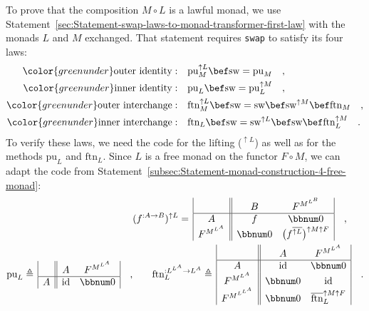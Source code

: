 To prove that the composition $M\circ L$ is a lawful monad, we use
Statement~\ref{sec:Statement-swap-laws-to-monad-transformer-first-law}
with the monads $L$ and $M$ exchanged. That statement requires \lstinline!swap!
to satisfy its four laws:
\begin{align*}
{\color{greenunder}\text{outer identity}:}\quad & \text{pu}_{M}^{\uparrow L}\bef\text{sw}=\text{pu}_{M}\quad,\\
{\color{greenunder}\text{inner identity}:}\quad & \text{pu}_{L}\bef\text{sw}=\text{pu}_{L}^{\uparrow M}\quad,\\
{\color{greenunder}\text{outer interchange}:}\quad & \text{ftn}_{M}^{\uparrow L}\bef\text{sw}=\text{sw}\bef\text{sw}^{\uparrow M}\bef\text{ftn}_{M}\quad,\\
{\color{greenunder}\text{inner interchange}:}\quad & \text{ftn}_{L}\bef\text{sw}=\text{sw}^{\uparrow L}\bef\text{sw}\bef\text{ftn}_{L}^{\uparrow M}\quad.
\end{align*}
To verify these laws, we need the code for the lifting ($^{\uparrow L}$)
as well as for the methods $\text{pu}_{L}$ and $\text{ftn}_{L}$.
Since $L$ is a free monad on the functor $F\circ M$, we can adapt
the code from Statement~\ref{subsec:Statement-monad-construction-4-free-monad}:
\begin{align*}
 & (f^{:A\rightarrow B})^{\uparrow L}=\,\begin{array}{|c||cc|}
 & B & F^{M^{L^{B}}}\\
\hline A & f & \bbnum 0\\
F^{M^{L^{A}}} & \bbnum 0 & \big(f^{\overline{\uparrow L}}\big)^{\uparrow M\uparrow F}
\end{array}\quad,\\
\text{pu}_{L}\triangleq\,\begin{array}{|c||cc|}
 & A & F^{M^{L^{A}}}\\
\hline A & \text{id} & \bbnum 0
\end{array}\quad, & \quad\quad\text{ftn}_{L}^{:L^{L^{A}}\rightarrow L^{A}}\triangleq\,\begin{array}{|c||cc|}
 & A & F^{M^{L^{A}}}\\
\hline A & \text{id} & \bbnum 0\\
F^{M^{L^{A}}} & \bbnum 0 & \text{id}\\
F^{M^{L^{L^{A}}}} & \bbnum 0 & \overline{\text{ftn}}_{L}^{\uparrow M\uparrow F}
\end{array}\quad.
\end{align*}

